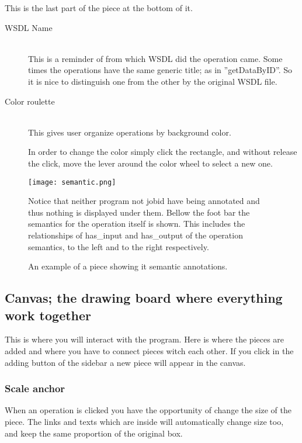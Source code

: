 \documentclass[a4paper,10pt]{article}
\begin{document}
    This is the last part of the piece at the bottom of it.

    \begin{description}
      \item[WSDL Name] \hfill \\
      This is a reminder of from which WSDL did the operation came. Some times the operations have the same generic title; as in ''getDataByID''. So it is nice to distinguish one from the other by the original WSDL file.

      \item[Color roulette] \hfill \\
      This gives user organize operations by background color.

      In order to change the color simply click the rectangle, and without release the click, move the lever around the color wheel to select a new one.
    \end{description}


    \begin{figure}[H]
    {\centering  
    \texttt{[image: semantic.png]}
    \caption{An example of a piece showing it semantic annotations. }\label{fig:pieceComplete}}
    \medskip
    \small
    Notice that neither program not jobid have being annotated and thus nothing is displayed under them. Bellow the foot bar the semantics for the operation itself is shown. This includes the relationships of has\_input and has\_output of the operation semantics, to the left and to the right respectively.
    \end{figure}

  \subsection{Canvas; the drawing board where everything work together}

  This is where you will interact with the program. Here is where the pieces are added and where you have to connect pieces witch each other. If you click in the adding button of the sidebar a new piece will appear in the canvas.\vspace{3 mm}

    \subsubsection{Scale anchor}
    When an operation is clicked you have the opportunity of change the size of the piece. The links and texts which are inside will automatically change size too, and keep the same proportion of the original box.
\end{document}
